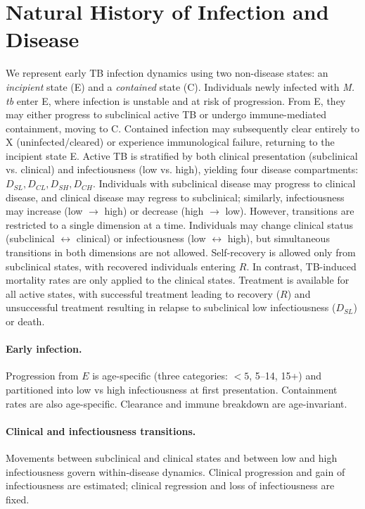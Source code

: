 \documentclass[11pt]{article}
\begin{document}
\section{Natural History of Infection and Disease}
We represent early TB infection dynamics using two non-disease states: an \emph{incipient} state (E) and a \emph{contained} state (C). Individuals newly infected with \emph{M. tb} enter E, where infection is unstable and at risk of progression. From E, they may either progress to subclinical active TB or undergo immune-mediated containment, moving to C. Contained infection may subsequently clear entirely to X (uninfected/cleared) or experience immunological failure, returning to the incipient state E.
Active TB is stratified by both clinical presentation (subclinical vs. clinical) and infectiousness (low vs. high), yielding four disease compartments: $D_{SL}, D_{CL}, D_{SH}, D_{CH}$. Individuals with subclinical disease may progress to clinical disease, and clinical disease may regress to subclinical; similarly, infectiousness may increase (low $\to$ high) or decrease (high $\to$ low).
However, transitions are restricted to a single dimension at a time. Individuals may change clinical status (subclinical $\leftrightarrow$ clinical) or infectiousness (low $\leftrightarrow$ high), but simultaneous transitions in both dimensions are not allowed. 
Self-recovery is allowed only from subclinical states, with recovered individuals entering $R$. In contrast, TB-induced mortality rates are only applied to the clinical states.
Treatment is available for all active states, with successful treatment leading to recovery ($R$) and unsuccessful treatment resulting in relapse to subclinical low infectiousness ($D_{SL}$) or death.

\paragraph{Early infection.}
Progression from \(E\) is age-specific (three categories: $<5$, 5--14, 15+) and partitioned into low vs high infectiousness at first presentation. Containment rates are also age-specific. Clearance and immune breakdown are age-invariant.

\paragraph{Clinical and infectiousness transitions.}
\label{sec:tb_disease}
Movements between subclinical and clinical states and between low and high infectiousness govern within-disease dynamics. Clinical progression and gain of infectiousness are estimated; clinical regression and loss of infectiousness are fixed.
\end{document}
